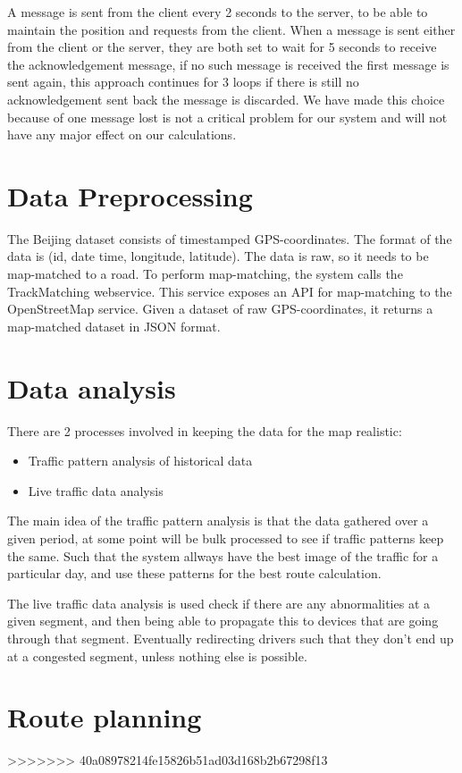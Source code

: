 A message is sent from the client every 2 seconds to the server, to be able to maintain the position and requests from the client.
When a message is sent either from the client or the server, they are both set to wait for 5 seconds to receive the acknowledgement message, if no such message is received the first message is sent again, this approach continues for 3 loops if there is still no acknowledgement sent back the message is discarded. We have made this choice because of one message lost is not a critical problem for our system and will not have any major effect on our calculations.
\section{Data Preprocessing}
The Beijing dataset consists of timestamped GPS-coordinates. The format of the data is (id, date time, longitude, latitude). The data is raw, so it needs to be map-matched to a road. To perform map-matching, the system calls the TrackMatching webservice\cite{TrackMatching}. This service exposes an API for map-matching to the OpenStreetMap service. Given a dataset of raw GPS-coordinates, it returns a map-matched dataset in JSON format.

\section{Data analysis}
There are 2 processes involved in keeping the data for the map realistic:
\begin{itemize}
	\item Traffic pattern analysis of historical data
	\item Live traffic data analysis
\end{itemize}

The main idea of the traffic pattern analysis is that the data gathered over a given period, at some point will be bulk processed to see if traffic patterns keep the same. Such that the system allways have the best image of the traffic for a particular day, and use these patterns for the best route calculation.

The live traffic data analysis is used check if there are any abnormalities at a given segment, and then being able to propagate this to devices that are going through that segment. Eventually redirecting drivers such that they don't end up at a congested segment, unless nothing else is possible.
\section{Route planning}
>>>>>>> 40a08978214fe15826b51ad03d168b2b67298f13
